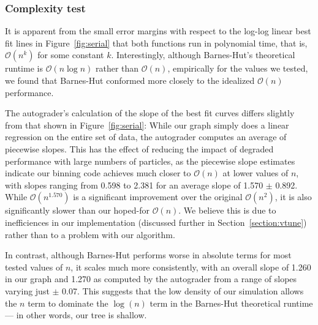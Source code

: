 \documentclass{article}
\begin{document}
\subsubsection{Complexity test}
It is apparent from the small error margins with respect to the log-log linear
best fit lines in Figure~\ref{fig:serial} that both functions run in polynomial
time, that is, $\mathcal{O}(n^k)$ for some constant $k$.  Interestingly,
although Barnes-Hut's theoretical runtime is $\mathcal{O}(n\log n)$ rather than
$\mathcal{O}(n)$, empirically for the values we tested, we found that Barnes-Hut
conformed more closely to the idealized $\mathcal{O}(n)$ performance.

The autograder's calculation of the slope of the best fit curves differs
slightly from that shown in Figure~\ref{fig:serial}: While our graph simply
does a linear regression on the entire set of data, the autograder computes an
average of piecewise slopes. This has the effect of reducing the impact of
degraded performance with large numbers of particles, as the piecewise slope
estimates indicate our binning code achieves much closer to $\mathcal{O}(n)$ at
lower values of $n$, with slopes ranging from 0.598 to 2.381 for an average
slope of 1.570 $\pm$ 0.892. While $\mathcal{O}(n^{1.570})$ is a significant
improvement over the original $\mathcal{O}(n^2)$, it is also significantly
slower than our hoped-for $\mathcal{O}(n)$. We believe this is due to
inefficiences in our implementation (discussed further in
Section~\ref{section:vtune}) rather than to a problem with our algorithm.

In contrast, although Barnes-Hut performs worse in absolute terms for most
tested values of $n$, it scales much more consistently, with an overall slope of
1.260 in our graph and 1.270 as computed by the autograder from a range of
slopes varying just $\pm$ 0.07. This suggests that the low density of our
simulation allows the $n$ term to dominate the $\log(n)$ term in the Barnes-Hut
theoretical runtime --- in other words, our tree is shallow.
\end{document}
